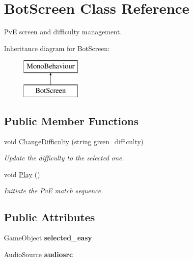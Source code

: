 \hypertarget{class_bot_screen}{}\section{Bot\+Screen Class Reference}
\label{class_bot_screen}


PvE screen and difficulty management.  


Inheritance diagram for Bot\+Screen\+:\begin{figure}[H]
\begin{center}
\leavevmode
\includegraphics[height=2.000000cm]{class_bot_screen}
\end{center}
\end{figure}
\subsection*{Public Member Functions}
\begin{DoxyCompactItemize}
\item 
\mbox{\label{class_bot_screen_a0d4926b1ac8cb0e45f72b127cd297f94}} 
void \mbox{\hyperlink{class_bot_screen_a0d4926b1ac8cb0e45f72b127cd297f94}{Change\+Difficulty}} (string given\+\_\+difficulty)
\begin{DoxyCompactList}\small\item\em Update the difficulty to the selected one. \end{DoxyCompactList}\item 
\mbox{\label{class_bot_screen_a594089f360bedf3ae9aff037401a504c}} 
void \mbox{\hyperlink{class_bot_screen_a594089f360bedf3ae9aff037401a504c}{Play}} ()
\begin{DoxyCompactList}\small\item\em Initiate the PvE match sequence. \end{DoxyCompactList}\end{DoxyCompactItemize}
\subsection*{Public Attributes}
\begin{DoxyCompactItemize}
\item 
\mbox{\label{class_bot_screen_a6bfbc4fa0fb32c1eaddab0d8f4a696a7}} 
Game\+Object {\bfseries selected\+\_\+easy}
\item 
\mbox{\label{class_bot_screen_ad005dc3b790b271432c1a7146acd1057}} 
Audio\+Source {\bfseries audiosrc}
\end{DoxyCompactItemize}
